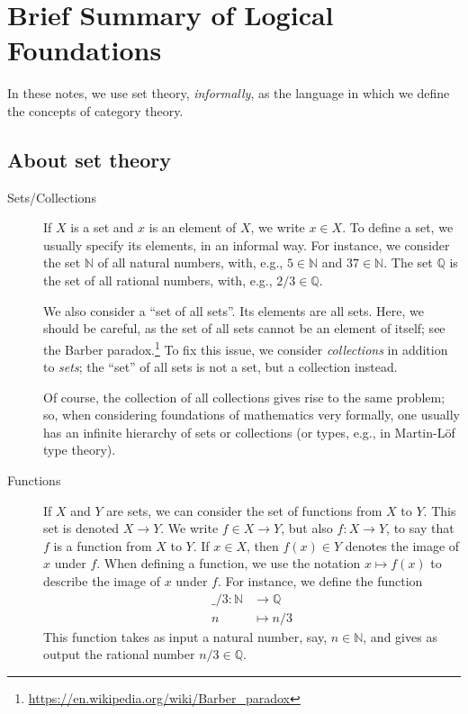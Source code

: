 \documentclass[a4paper,11pt, oneside,titlepage=false]{scrbook}
\theoremstyle{plain}
\theoremstyle{definition}
\newcommand{\NN}{\ensuremath{\mathbb{N}}}
\newcommand{\QQ}{\ensuremath{\mathbb{Q}}}
\begin{document}
\chapter{Brief Summary of Logical Foundations}
\label{sec:notation}

In these notes, we use set theory, \emph{informally}, as the language in which we define the concepts of category theory.

\section{About set theory}

\begin{description}
\item [Sets/Collections] If $X$ is a set and $x$ is an element of $X$, we write $x \in X$.
  To define a set, we usually specify its elements, in an informal way.
  For instance, we consider the set $\NN$ of all natural numbers, with, e.g., $5 \in \NN$ and $37 \in \NN$.
  The set $\QQ$ is the set of all rational numbers, with, e.g., $2/3 \in \QQ$.

  We also consider a ``set of all sets''. Its elements are all sets.
  Here, we should be careful, as the set of all sets cannot be an element of itself; see the Barber paradox.\footnote{\url{https://en.wikipedia.org/wiki/Barber_paradox}}
  To fix this issue, we consider \emph{collections} in addition to \emph{sets};
  the ``set'' of all sets is not a set, but a collection instead.

  Of course, the collection of all collections gives rise to the same problem;
  so, when considering foundations of mathematics very formally, one usually has an infinite hierarchy of sets or collections (or types, e.g., in Martin-Löf type theory).
  
\item [Functions] If $X$ and $Y$ are sets, we can consider the set of functions from $X$ to $Y$. This set is denoted $X \to Y$. We write $f \in X \to Y$, but also $f : X \to Y$, to say that $f$ is a function from $X$ to $Y$.
  If $x \in X$, then $f(x) \in Y$ denotes the image of $x$ under $f$.
  When defining a function, we use the notation $x \mapsto f(x)$ to describe the image of $x$ under $f$. For instance, we define the function
  \begin{align*}
    \_/3 : \NN &\to \QQ
    \\
    n & \mapsto n/3
  \end{align*}
  This function takes as input a natural number, say, $n \in \NN$, and gives as output the rational number $n/3 \in \QQ$.
  

\end{description}
\end{document}
